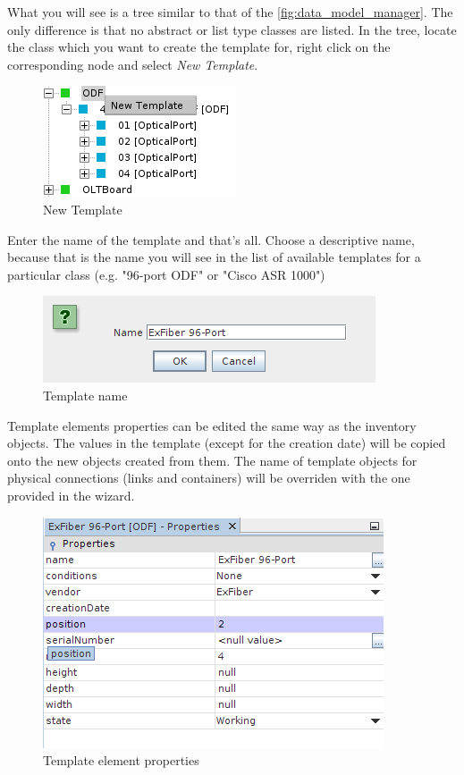 \documentclass[a4paper]{article}
\begin{document}
	What you will see is a tree similar to that of the \ref{fig:data_model_manager}. The only difference is that no abstract or list type classes are listed. In the tree, locate the class which you want to create the template for, right click on the corresponding node and select \textit{New Template}.
	
	\begin{figure}[h!]
		\centering
		\includegraphics[width=0.3\linewidth]{img/template_manager_new_template.png}
		\caption{New Template}
		\label{fig:template_manager_new_template}
	\end{figure}
	
	Enter the name of the template and that's all. Choose a descriptive name, because that is the name you will see in the list of available templates for a particular class (e.g. "96-port ODF" or "Cisco ASR 1000")
	
	\begin{figure}[h!]
		\centering
		\includegraphics[width=0.6\linewidth]{img/template_manager_template_name.png}
		\caption{Template name}
		\label{fig:template_manager_name}
	\end{figure}
	
	Template elements properties can be edited the same way as the inventory objects. The values in the template (except for the creation date) will be copied onto the new objects created from them. The name of template objects for physical connections (links and containers) will be overriden with the one provided in the wizard.
	\newpage
	\begin{figure}[h!]
		\centering
		\includegraphics[width=0.6\linewidth]{img/template_manager_template_properties.png}
		\caption{Template element properties}
		\label{fig:template_manager_template_properties}
	\end{figure}
	
\end{document}
